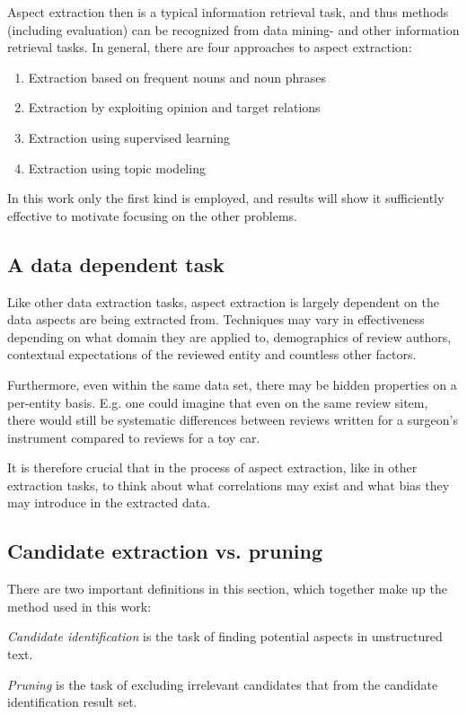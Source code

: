 \documentclass[a4paper,11pt]{kth-mag}
\begin{document}
Aspect extraction then is a typical information retrieval task, and thus methods
(including evaluation) can be recognized from data mining- and other information retrieval tasks.
In general, there are four approaches to aspect extraction\cite[chapter 5.3]{liu2012sentiment}:

\begin{enumerate}
\item Extraction based on frequent nouns and noun phrases
\item Extraction by exploiting opinion and target relations
\item Extraction using supervised learning
\item Extraction using topic modeling
\end{enumerate}
In this work only the first kind is employed, and results will show it sufficiently
effective to motivate focusing on the other problems.

\subsection{A data dependent task}
Like other data extraction tasks, aspect extraction is largely dependent on the data
aspects are being extracted from. Techniques may vary in effectiveness depending
on what domain they are applied to, demographics of review authors,
contextual expectations of the reviewed entity and countless other factors.

Furthermore, even within the same data set, there may be hidden properties on a
per-entity basis. E.g. one could imagine that even on the same review sitem, there would still
be systematic differences between reviews written for a surgeon's instrument
compared to reviews for a toy car.

It is therefore crucial that in the process of aspect extraction, like in other extraction tasks,
to think about what correlations may exist and what bias they may introduce in the extracted data.


\subsection{Candidate extraction vs. pruning}
There are two important definitions in this section,
which together make up the method used in this work:

\emph{Candidate identification} is the task of finding potential aspects in unstructured text.

\emph{Pruning} is the task of excluding irrelevant candidates that from the candidate
identification result set.
\end{document}

